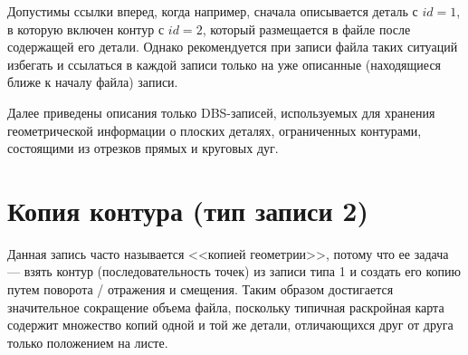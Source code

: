 Допустимы ссылки вперед,
когда например, сначала описывается деталь с
$id=1$,
в которую включен контур с
$id=2$,
который размещается в файле после содержащей его детали.
Однако рекомендуется при записи файла таких ситуаций избегать
и ссылаться в каждой записи только на уже описанные
(находящиеся ближе к началу файла)
записи.

Далее приведены описания только DBS-записей,
используемых для хранения геометрической информации
о плоских деталях,
ограниченных контурами,
состоящими из отрезков прямых
и круговых дуг.

\section*{Копия контура (тип записи 2)}
Данная запись часто называется <<копией геометрии>>,
потому что ее задача ---
взять контур
(последовательность точек)
из записи типа 1 и создать его копию путем поворота / отражения и смещения.
Таким образом достигается значительное
сокращение объема файла,
поскольку типичная раскройная карта
содержит множество копий одной и той же детали,
отличающихся друг от друга только положением на листе.



